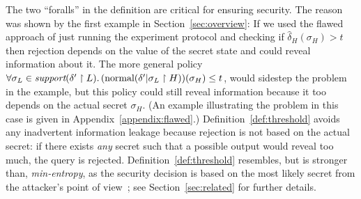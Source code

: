 The two ``foralls'' in the definition are critical for ensuring
security.  The reason was shown by the first example in
Section~\ref{sec:overview}: If we used the flawed approach of just
running the experiment protocol and checking if
$\hat{\delta}_H(\sigma_H) > t$ then rejection depends on the value of
the secret state and could reveal information about it.  The more
general policy $\forall \sigma_L \in 
\textit{support}(\delta' \upharpoonright L).\,
(\text{normal}(\delta' | \sigma_L \upharpoonright H))(\sigma_H) \leq t$,
would sidestep the problem in the example, but this policy could still reveal
information because it too depends on the actual secret $\sigma_H$.
\iffull
(An example illustrating the problem in this case is given in 
Appendix~\ref{appendix:flawed}.)
\fi
Definition~\ref{def:threshold} avoids any inadvertent
information leakage because rejection is not based on the actual
secret: if there exists \emph{any} secret such that a possible output
would reveal too much, the query is rejected.
Definition~\ref{def:threshold} resembles, but is stronger than,
\emph{min-entropy}, as the 
security decision is based on the most likely secret from the
attacker's point of view~\cite{smith09foundations}; see
Section~\ref{sec:related} for further details.



